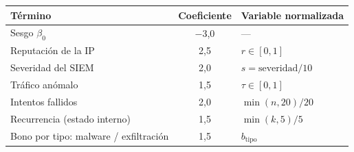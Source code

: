 \begin{tabular}{lcl}
\toprule
Término & Coeficiente & Variable normalizada \\
\midrule
Sesgo $\beta_0$ & $-$3,0 & --- \\
Reputación de la IP & 2,5 & $r\in[0,1]$ \\
Severidad del SIEM & 2,0 & $s=\text{severidad}/10$ \\
Tráfico anómalo & 1,5 & $\tau\in[0,1]$ \\
Intentos fallidos & 2,0 & $\min(n,20)/20$ \\
Recurrencia (estado interno) & 1,5 & $\min(k,5)/5$ \\
Bono por tipo: malware / exfiltración & 1,5 & $b_{\text{tipo}}$ \\
\bottomrule
\end{tabular}
